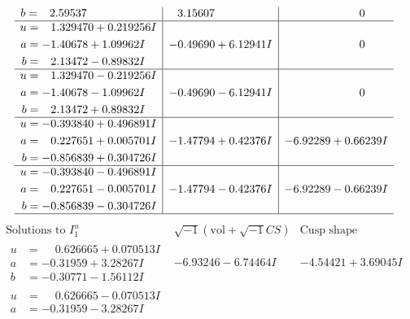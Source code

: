 \documentclass[1p]{elsarticle_modified}
\theoremstyle{definition}
\newcommand{\I}{\sqrt{-1}}
\begin{document}
$$\begin{array}{c|c|c}
\begin{aligned}
b &= \phantom{-}2.59537\phantom{ +0.000000I}\end{aligned}
 & \phantom{-}3.15607\phantom{ +0.000000I} & \phantom{-0.000000 } 0 \\ \hline\begin{aligned}
u &= \phantom{-}1.329470 + 0.219256 I \\
a &= -1.40678 + 1.09962 I \\
b &= \phantom{-}2.13472 - 0.89832 I\end{aligned}
 & -0.49690 + 6.12941 I & \phantom{-0.000000 } 0 \\ \hline\begin{aligned}
u &= \phantom{-}1.329470 - 0.219256 I \\
a &= -1.40678 - 1.09962 I \\
b &= \phantom{-}2.13472 + 0.89832 I\end{aligned}
 & -0.49690 - 6.12941 I & \phantom{-0.000000 } 0 \\ \hline\begin{aligned}
u &= -0.393840 + 0.496891 I \\
a &= \phantom{-}0.227651 + 0.005701 I \\
b &= -0.856839 + 0.304726 I\end{aligned}
 & -1.47794 + 0.42376 I & -6.92289 + 0.66239 I \\ \hline\begin{aligned}
u &= -0.393840 - 0.496891 I \\
a &= \phantom{-}0.227651 - 0.005701 I \\
b &= -0.856839 - 0.304726 I\end{aligned}
 & -1.47794 - 0.42376 I & -6.92289 - 0.66239 I\\
 \hline 
 \end{array}$$\newpage$$\begin{array}{c|c|c}  
\text{Solutions to }I^u_{1}& \I (\text{vol} + \sqrt{-1}CS) & \text{Cusp shape}\\
 \hline 
\begin{aligned}
u &= \phantom{-}0.626665 + 0.070513 I \\
a &= -0.31959 + 3.28267 I \\
b &= -0.30771 - 1.56112 I\end{aligned}
 & -6.93246 - 6.74464 I & -4.54421 + 3.69045 I \\ \hline\begin{aligned}
u &= \phantom{-}0.626665 - 0.070513 I \\
a &= -0.31959 - 3.28267 I \\

\end{aligned}
\end{array}$$
\end{document}
